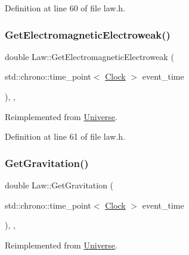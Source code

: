 Definition at line 60 of file law.\+h.

\mbox{\label{class_law_ae4ccaca7b78905f416f35f9556b1923c}} 
\subsubsection{\texorpdfstring{Get\+Electromagnetic\+Electroweak()}{GetElectromagneticElectroweak()}}
{\footnotesize\ttfamily double Law\+::\+Get\+Electromagnetic\+Electroweak (\begin{DoxyParamCaption}\item[{std\+::chrono\+::time\+\_\+point$<$ \hyperlink{universe_8h_a0ef8d951d1ca5ab3cfaf7ab4c7a6fd80}{Clock} $>$}]{event\+\_\+time }\end{DoxyParamCaption})\hspace{0.3cm}{\ttfamily [inline]}, {\ttfamily [final]}, {\ttfamily [virtual]}}



Reimplemented from \hyperlink{class_universe_a9f099605c082e7fa755787a6a8cab7ba}{Universe}.



Definition at line 61 of file law.\+h.

\mbox{\label{class_law_a84bdc0c2ca97a9c19422018ff761b992}} 
\subsubsection{\texorpdfstring{Get\+Gravitation()}{GetGravitation()}}
{\footnotesize\ttfamily double Law\+::\+Get\+Gravitation (\begin{DoxyParamCaption}\item[{std\+::chrono\+::time\+\_\+point$<$ \hyperlink{universe_8h_a0ef8d951d1ca5ab3cfaf7ab4c7a6fd80}{Clock} $>$}]{event\+\_\+time }\end{DoxyParamCaption})\hspace{0.3cm}{\ttfamily [inline]}, {\ttfamily [final]}, {\ttfamily [virtual]}}



Reimplemented from \hyperlink{class_universe_ab0404e774ee0ed66b597ff5b8e989446}{Universe}.



